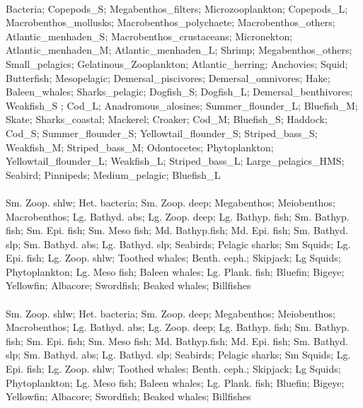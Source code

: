 \fullhline
\hline
{} \\
\hline
Bacteria; Copepods\_S; Megabenthos\_filters; Microzooplankton; Copepods\_L; Macrobenthos\_mollusks; Macrobenthos\_polychaete; Macrobenthos\_others; Atlantic\_menhaden\_S; Macrobenthos\_crustaceans; Micronekton; Atlantic\_menhaden\_M; Atlantic\_menhaden\_L; Shrimp; Megabenthos\_others; Small\_pelagics; Gelatinous\_Zooplankton; Atlantic\_herring; Anchovies; Squid; Butterfish; Mesopelagic; Demersal\_piscivores; Demersal\_omnivores; Hake; Baleen\_whales; Sharks\_pelagic; Dogfish\_S; Dogfish\_L; Demersal\_benthivores; Weakfish\_S ; Cod\_L; Anadromous\_alosines; Summer\_flounder\_L; Bluefish\_M; Skate; Sharks\_coastal; Mackerel; Croaker; Cod\_M; Bluefish\_S; Haddock; Cod\_S; Summer\_flounder\_S; Yellowtail\_flounder\_S; Striped\_bass\_S; Weakfish\_M; Striped\_bass\_M; Odontocetes; Phytoplankton; Yellowtail\_flounder\_L; Weakfish\_L; Striped\_bass\_L; Large\_pelagics\_HMS; Seabird; Pinnipeds; Medium\_pelagic; Bluefish\_L\\
\fullhline
\hline
{} \\
\hline
Sm. Zoop. shlw; Het. bacteria; Sm. Zoop. deep; Megabenthos; Meiobenthos; Macrobenthos; Lg. Bathyd. abs; Lg. Zoop. deep; Lg. Bathyp. fish; Sm. Bathyp. fish; Sm. Epi. fish; Sm. Meso fish; Md. Bathyp.fish; Md. Epi. fish; Sm. Bathyd. slp; Sm. Bathyd. abs; Lg. Bathyd. slp; Seabirds; Pelagic sharks; Sm Squids; Lg. Epi. fish; Lg. Zoop. shlw; Toothed whales; Benth. ceph.; Skipjack; Lg Squids; Phytoplankton; Lg. Meso fish; Baleen whales; Lg. Plank. fish; Bluefin; Bigeye; Yellowfin; Albacore; Swordfish; Beaked whales; Billfishes\\
\fullhline
\hline
{} \\
\hline
Sm. Zoop. shlw; Het. bacteria; Sm. Zoop. deep; Megabenthos; Meiobenthos; Macrobenthos; Lg. Bathyd. abs; Lg. Zoop. deep; Lg. Bathyp. fish; Sm. Bathyp. fish; Sm. Epi. fish; Sm. Meso fish; Md. Bathyp.fish; Md. Epi. fish; Sm. Bathyd. slp; Sm. Bathyd. abs; Lg. Bathyd. slp; Seabirds; Pelagic sharks; Sm Squids; Lg. Epi. fish; Lg. Zoop. shlw; Toothed whales; Benth. ceph.; Skipjack; Lg Squids; Phytoplankton; Lg. Meso fish; Baleen whales; Lg. Plank. fish; Bluefin; Bigeye; Yellowfin; Albacore; Swordfish; Beaked whales; Billfishes\\
\fullhline
\hline
{} \\
